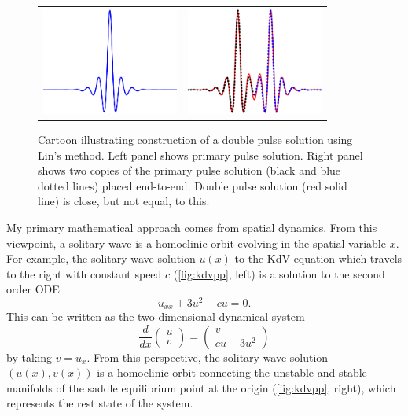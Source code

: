 \documentclass[11pt,reqno,oneside]{article}
\theoremstyle{definition}
\theoremstyle{remark}
\begin{document}
\begin{figure}
    \centering
    \begin{tabular}{cc}
        \includegraphics[width=4.5cm]{images/linchen1.png} &
        \includegraphics[width=4.5cm]{images/linchen2.png} 
    \end{tabular}
    \caption{Cartoon illustrating construction of a double pulse solution using Lin's method. Left panel shows primary pulse solution. Right panel shows two copies of the primary pulse solution (black and blue dotted lines) placed end-to-end. Double pulse solution (red solid line) is close, but not equal, to this.}
    \label{fig:linsmethod}
\end{figure}

My primary mathematical approach comes from spatial dynamics. From this viewpoint, a solitary wave is a homoclinic orbit evolving in the spatial variable $x$. For example, the solitary wave solution $u(x)$ to the KdV equation which travels to the right with constant speed $c$ (\cref{fig:kdvpp}, left) is a solution to the second order ODE 
\[
u_{xx} + 3 u^2 - c u = 0.
\]
This can be written as the two-dimensional dynamical system 
\[
\frac{d}{dx}\begin{pmatrix}u\\v\end{pmatrix}
= \begin{pmatrix}v \\ cu - 3u^2\end{pmatrix}
\]
by taking $v = u_x$. From this perspective, the solitary wave solution $(u(x), v(x))$ is a homoclinic orbit connecting the unstable and stable manifolds of the saddle equilibrium point at the origin (\cref{fig:kdvpp}, right), which represents the rest state of the system. 
\end{document}
